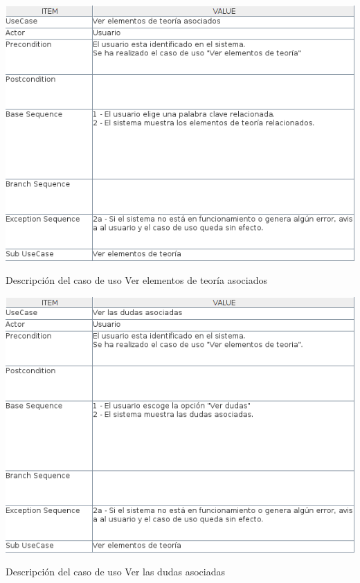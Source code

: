 \documentclass[openright,twoside,10pt]{book}
\begin{document}
    \begin{table}[H]
        \begin{center}
            \includegraphics[width=\textwidth]{img/astah/analisis/casos_de_uso/useCase02.png}
        \end{center}
        \caption{Descripción del caso de uso Ver elementos de teoría asociados}
    \end{table}
    
    \vspace*{\fill}
    
    \newpage
    
    \vspace*{\fill}
    
    \begin{table}[H]
        \begin{center}
            \includegraphics[width=\textwidth]{img/astah/analisis/casos_de_uso/useCase03.png}
        \end{center}
        \caption{Descripción del caso de uso Ver las dudas asociadas}
    \end{table}
    
\end{document}
